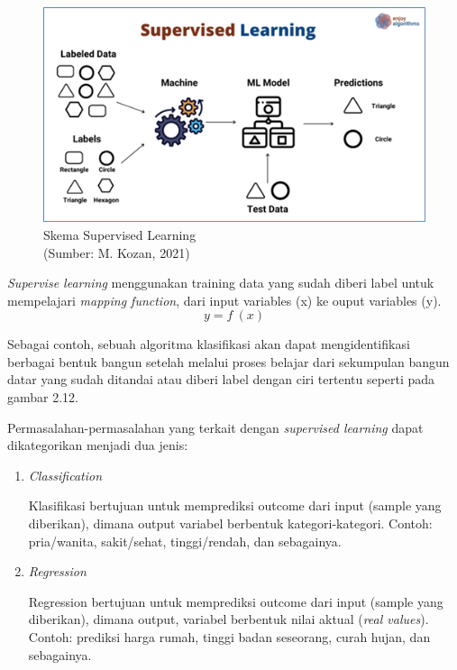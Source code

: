 \begin{figure}[H]
	\vspace{-0.1cm}
	\begin{center}
		\includegraphics[width=1\columnwidth]{bab2/Gambar/Picture8.png}
	\end{center}
	\vspace{-0.2cm}
	\caption{Skema Supervised Learning\\(Sumber: M. Kozan, 2021)}\label{img:Skema-Supervised-Learning}
\end{figure}

\textit{Supervise learning} menggunakan training data yang sudah diberi label untuk mempelajari \textit{mapping function}, dari input variables (x) ke ouput variables (y).
\[y=f\ (x)\]

Sebagai contoh, sebuah algoritma klasifikasi akan dapat mengidentifikasi berbagai bentuk bangun setelah melalui proses belajar dari sekumpulan bangun datar yang sudah ditandai atau diberi label dengan ciri tertentu seperti pada gambar 2.12.

Permasalahan-permasalahan yang terkait dengan \textit{supervised learning} dapat dikategorikan menjadi dua jenis:
\begin{enumerate}
	\item \textit{Classification}
	
	Klasifikasi bertujuan untuk memprediksi outcome dari input (sample yang diberikan), dimana output variabel berbentuk kategori-kategori. Contoh: pria/wanita, sakit/sehat, tinggi/rendah, dan sebagainya.
	
	\item \textit{Regression}
	
	Regression bertujuan untuk memprediksi outcome dari input (sample yang diberikan), dimana output, variabel berbentuk nilai aktual (\textit{real values}). Contoh: prediksi harga rumah, tinggi badan seseorang, curah hujan, dan sebagainya. 
	
\end{enumerate}

